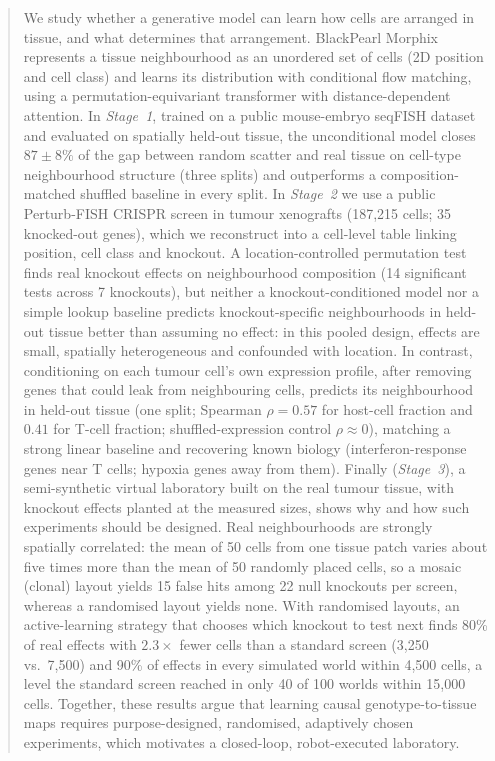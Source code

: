 \documentclass[journal]{IEEEtran}
\begin{document}
\begin{abstract}
We study whether a generative model can learn how cells are arranged in tissue, and what determines that arrangement. BlackPearl Morphix represents a tissue neighbourhood as an unordered set of cells (2D position and cell class) and learns its distribution with conditional flow matching, using a permutation-equivariant transformer with distance-dependent attention. In \emph{Stage~1}, trained on a public mouse-embryo seqFISH dataset and evaluated on spatially held-out tissue, the unconditional model closes $87 \pm 8\%$ of the gap between random scatter and real tissue on cell-type neighbourhood structure (three splits) and outperforms a composition-matched shuffled baseline in every split. In \emph{Stage~2} we use a public Perturb-FISH CRISPR screen in tumour xenografts (187{,}215 cells; 35 knocked-out genes), which we reconstruct into a cell-level table linking position, cell class and knockout. A location-controlled permutation test finds real knockout effects on neighbourhood composition (14 significant tests across 7 knockouts), but neither a knockout-conditioned model nor a simple lookup baseline predicts knockout-specific neighbourhoods in held-out tissue better than assuming no effect: in this pooled design, effects are small, spatially heterogeneous and confounded with location. In contrast, conditioning on each tumour cell's own expression profile, after removing genes that could leak from neighbouring cells, predicts its neighbourhood in held-out tissue (one split; Spearman $\rho = 0.57$ for host-cell fraction and $0.41$ for T-cell fraction; shuffled-expression control $\rho \approx 0$), matching a strong linear baseline and recovering known biology (interferon-response genes near T cells; hypoxia genes away from them). Finally (\emph{Stage~3}), a semi-synthetic virtual laboratory built on the real tumour tissue, with knockout effects planted at the measured sizes, shows why and how such experiments should be designed. Real neighbourhoods are strongly spatially correlated: the mean of 50 cells from one tissue patch varies about five times more than the mean of 50 randomly placed cells, so a mosaic (clonal) layout yields 15 false hits among 22 null knockouts per screen, whereas a randomised layout yields none. With randomised layouts, an active-learning strategy that chooses which knockout to test next finds 80\% of real effects with $2.3\times$ fewer cells than a standard screen (3{,}250 vs.\ 7{,}500) and 90\% of effects in every simulated world within 4{,}500 cells, a level the standard screen reached in only 40 of 100 worlds within 15{,}000 cells. Together, these results argue that learning causal genotype-to-tissue maps requires purpose-designed, randomised, adaptively chosen experiments, which motivates a closed-loop, robot-executed laboratory.
\end{abstract}
\end{document}

